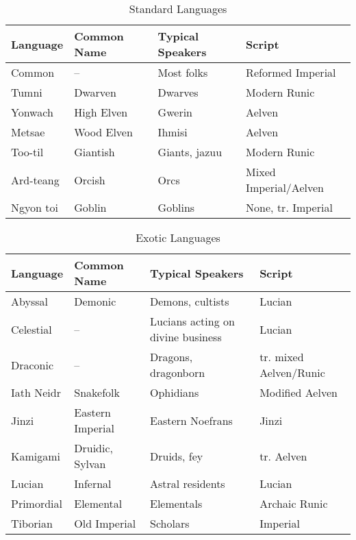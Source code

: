 \begin{table*}[ht]
    \centering
        \begin{tabularx}{\textwidth}{|X |X |X |X |}
            \hline
            Language & Common Name & Typical Speakers & Script \\
            \hline
            Common & -- & Most folks & Reformed Imperial \\\hline
            Tumni & Dwarven & Dwarves & Modern Runic \\\hline
            Yonwach & High Elven & Gwerin & Aelven \\\hline
            Metsae & Wood Elven & Ihmisi & Aelven \\\hline
            Too-til & Giantish & Giants, jazuu & Modern Runic \\\hline
            Ard-teang & Orcish & Orcs & Mixed Imperial/Aelven \\\hline
            Ngyon toi & Goblin & Goblins & None, tr. Imperial \\
            \hline            
        \end{tabularx}
    \caption[Languages]{Standard Languages}
    \label{tbl:standard-languages}
\end{table*}

\begin{table*}[ht]
    \centering
        \begin{tabularx}{\textwidth}{|X |X |X |X |}
            \hline
            Language & Common Name & Typical Speakers & Script \\
            \hline
            Abyssal & Demonic & Demons, cultists & Lucian \\\hline
            Celestial & -- & Lucians acting on divine business & Lucian \\\hline
            Draconic & -- & Dragons, dragonborn & tr. mixed Aelven/Runic \\\hline
            Iath Neidr & Snakefolk & Ophidians & Modified Aelven \\\hline
            Jinzi & Eastern Imperial & Eastern Noefrans & Jinzi \\\hline
            Kamigami & Druidic, Sylvan & Druids, fey & tr. Aelven \\\hline
            Lucian & Infernal & Astral residents & Lucian \\\hline
            Primordial & Elemental & Elementals & Archaic Runic \\\hline
            Tiborian & Old Imperial & Scholars & Imperial \\ 
            \hline            
        \end{tabularx}
    \caption[Languages2]{Exotic Languages\label{tbl:exotic-languages}}
\end{table*}

